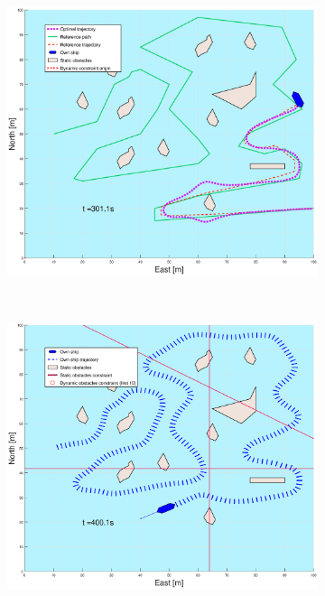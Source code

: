 \begin{figure}[ht]
\begin{subfigure}[b]{0.49\textwidth}
    \end{subfigure}
    \hfill
    \begin{subfigure}[b]{0.499\textwidth}
        \centering
        \includegraphics[width=\textwidth]{Images/Figures/skjergard_u_trafikk/_Simple_1fig999_time=301}
    \end{subfigure}
    \hfill
    \\
    \begin{subfigure}[b]{0.49\textwidth}
        \centering
        \includegraphics[width=\textwidth]{Images/Figures/skjergard_u_trafikk/_Simple_1fig1_time=400}

\end{subfigure}
\end{figure}
